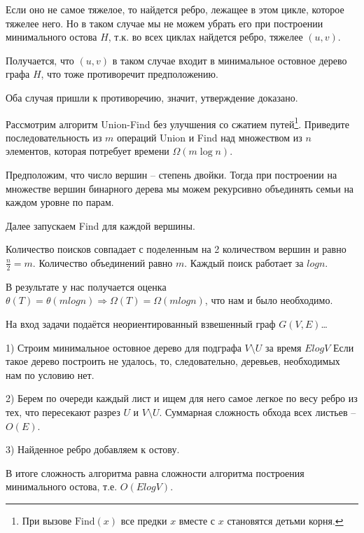 \documentclass[12pt]{extreport}
\theoremstyle{definiton}
\theoremstyle{definition}
\theoremstyle{definition}
\newcounter{problem}
\newcounter{subproblem}
\def\beforPRskip{
	\bigskip
}
\def\pr{\beforPRskip\noindent\stepcounter{problem}{\bf \theproblem .\;}\setcounter{subproblem}{0}}
\begin{document}
	Если оно не самое тяжелое, то найдется ребро, лежащее в этом цикле, которое тяжелее него. Но в таком случае мы не можем убрать его при построении минимального остова $H$, т.к. во всех циклах найдется ребро, тяжелее $(u, v)$.

	Получается, что $(u, v)$ в таком случае входит в минимальное остовное дерево графа $H$, что тоже противоречит предположению.

	Оба случая пришли к противоречию, значит, утверждение доказано.

\pr Рассмотрим алгоритм Union-Find без улучшения со сжатием путей\footnote{При вызове $\mathrm{Find}(x)$ все предки $x$ вместе с $x$ становятся детьми корня.}. Приведите последовательность из $m$ операций Union и Find над множеством из $n$ элементов, которая потребует времени $\Omega(m\log n)$.

	Предположим, что число вершин -- степень двойки. Тогда при построении на множестве вершин бинарного дерева мы можем рекурсивно объединять семьи на каждом уровне по парам.

	Далее запускаем Find для каждой вершины.

	Количество поисков совпадает с поделенным на 2 количеством вершин и равно $\frac{n}{2} = m$. Количество объединений равно $m$.
	Каждый поиск работает за $log n$.

	В результате у нас получается оценка $\theta(T) = \theta(mlogn) \Rightarrow \Omega(T) = \Omega(mlogn)$, что нам и было необходимо.

\pr На вход задачи подаётся неориентированный взвешенный граф $G(V,E)$\ldots

	1) Строим минимальное остовное дерево для подграфа $V\setminus U$ за время $ElogV$
	Если такое дерево построить не удалось, то, следовательно, деревьев, необходимых нам по условию нет.

	2) Берем по очереди каждый лист и ищем для него самое легкое по весу ребро из тех, что пересекают разрез $U$ и $V \setminus U$.
	Суммарная сложность обхода всех листьев -- $O(E)$.

	3) Найденное ребро добавляем к остову.

	В итоге сложность алгоритма равна сложности алгоритма построения минимального остова, т.е. $O(ElogV)$.
\end{document}
